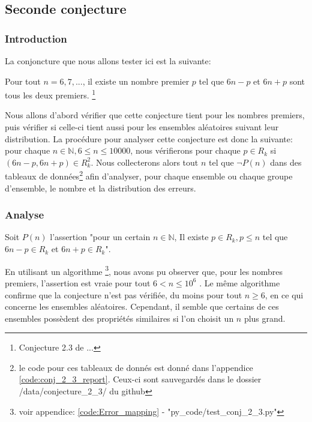 \documentclass[../main.text]{report}
\begin{document}
\subsection{Seconde conjecture}
\subsubsection{Introduction}

La conjoncture que nous allons tester ici est la suivante: 

	\begin{Conj}
	Pour tout $n = 6, 7, ...$, il existe un nombre premier $p$ tel que $6n-p$ et $6n+p$ sont tous les deux premiers. \footnote{Conjecture 2.3 de ...}
	\end{Conj}
	

Nous allons d'abord vérifier que cette conjecture tient pour les nombres premiers, puis vérifier si celle-ci tient aussi pour les ensembles aléatoires suivant leur distribution.
La procédure pour analyser cette conjecture est donc la suivante: pour chaque $n\in \mathbb{N}, 6 \leq n \leq 10000$, nous vérifierons pour chaque $p \in R_k$ si $(6n-p,6n+p) \in R_k^2$. Nous collecterons alors tout $n$ tel que $\neg P(n)$ dans des tableaux de données\footnote{le code pour ces tableaux de donnés est donné dans l'appendice \ref{code:conj_2_3_report}. Ceux-ci sont sauvegardés dans le dossier /data/conjecture\_2\_3/ du github} afin d'analyser, pour chaque ensemble ou chaque groupe d'ensemble, le nombre et la distribution des erreurs.

\subsubsection{Analyse}


Soit $P(n)$ l'assertion "pour un certain $n \in \mathbb{N}$, Il existe $p \in R_{k}, p \leq n$ tel que $6n-p \in R_k$ et $6n+p \in R_k$".

En utilisant un algorithme \footnote{voir appendice: \ref{code:Error_mapping} - "py\_code/test\_conj\_2\_3.py" }, nous avons pu observer que, pour les nombres premiers, l'assertion est vraie pour tout $6 < n \leq 10^6$ .
Le même algorithme confirme que la conjecture n'est pas vérifiée, du moins pour tout $n \geq 6$, en ce qui concerne les ensembles aléatoires. Cependant, il semble que certains de ces ensembles possèdent des propriétés similaires si l'on choisit un $n$ plus grand.
\end{document}
